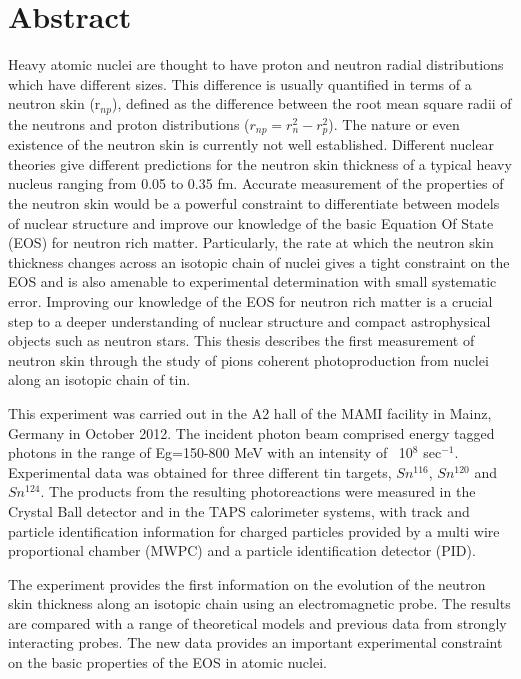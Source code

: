 \chapter*{Abstract}
\noindent

\indent Heavy atomic nuclei are thought to have proton and neutron radial distributions which have different sizes. This difference is usually quantified in terms of a neutron skin (r$_{np}$), defined as the difference between the root mean square radii of the neutrons and proton distributions ($r_{np} = r_{n}^{2} - r_{p}^{2}$). The nature or even existence of the neutron skin is currently not well established. Different nuclear theories give different predictions for the neutron skin thickness of a typical heavy nucleus ranging from 0.05 to 0.35 fm. Accurate measurement of the properties of the neutron skin would be a powerful constraint to differentiate between models of nuclear structure and improve our knowledge of the basic Equation Of State (EOS) for neutron rich matter. Particularly, the rate at which the neutron skin thickness changes across an isotopic chain of nuclei gives a tight constraint on the EOS and is also amenable to experimental determination with small systematic error. Improving our knowledge of the EOS for neutron rich matter is a crucial step to a deeper understanding of nuclear structure and compact astrophysical objects such as neutron stars. This thesis describes the first measurement of neutron skin through the study of pions coherent photoproduction from nuclei along an isotopic chain of tin. 

\indent This experiment was carried out in the A2 hall of the MAMI facility in Mainz, Germany in October 2012.  The incident photon beam comprised energy tagged photons in the range of Eg=150-800 MeV with an intensity of ~10$^{8}$ sec$^{-1}$. Experimental data was obtained for three different tin targets, $Sn^{116}$, $Sn^{120}$ and$ Sn^{124}$. The products from the resulting photoreactions were measured in the Crystal Ball detector and in the TAPS calorimeter systems, with track and particle identification information for charged particles provided by a multi wire proportional chamber (MWPC) and a particle identification detector (PID).

\indent The experiment provides the first information on the evolution of the neutron skin thickness along an isotopic chain using an electromagnetic probe. The results are compared with a range of theoretical models and previous data from strongly interacting probes. The new data provides an important experimental constraint on the basic properties of the EOS in atomic nuclei.

\indent

\vspace{10mm}
\normalsize

